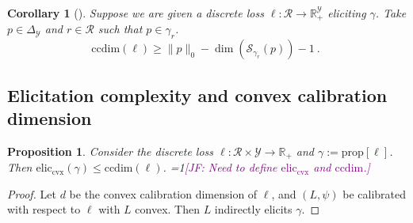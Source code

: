 \documentclass{article}
\newcommand{\Comments}{1}
\newcommand{\mynote}[2]{\ifnum\Comments=1\textcolor{#1}{#2}\fi}
\newcommand{\jessie}[1]{\mynote{purple}{[JF: #1]}}
\newcommand{\reals}{\mathbb{R}}
\newcommand{\simplex}{\Delta_\Y}
\newcommand{\prop}[1]{\mathrm{prop}[#1]}
\newcommand{\eliccvx}{\mathrm{elic}_\mathrm{cvx}}
\newcommand{\ccdim}{\mathrm{ccdim}}
\newcommand{\R}{\mathcal{R}}
\renewcommand{\S}{\mathcal{S}}
\newcommand{\Y}{\mathcal{Y}}
\newtheorem{lemma}{Lemma}
\newtheorem{proposition}{Proposition}
\newtheorem{corollary}{Corollary}
\begin{document}
%	
%	

\begin{corollary}[\cite{ramaswamy2016convex}]
	Suppose we are given a discrete loss $\ell:\R \to \reals^\Y_+$ eliciting $\gamma$.
	Take $p \in \simplex$ and $r \in \R$ such that $p \in \gamma_r$.
	\begin{equation}
	\ccdim(\ell) \geq \|p\|_0 - \dim(\S_{\gamma_r}(p)) - 1~.~
	\end{equation}
\end{corollary}

\subsection{Elicitation complexity and convex calibration dimension}

\begin{proposition}
	Consider the discrete loss $\ell : \R \times \Y \to \reals_+$ and $\gamma:= \prop{\ell}$.
	Then $\eliccvx(\gamma) \leq \ccdim(\ell)$.
	\jessie{Need to define $\eliccvx$ and $\ccdim$.}
\end{proposition}
\begin{proof}
	Let $d$ be the convex calibration dimension of $\ell$, and $(L, \psi)$ be calibrated with respect to $\ell$ with $L$ convex.
	Then $L$ indirectly elicits $\gamma$.
\end{proof}
\end{document}

